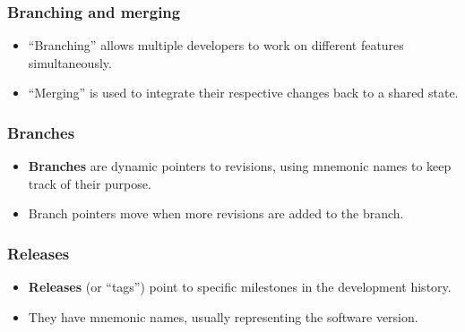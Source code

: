 \documentclass[aspectratio=169,xcolor=table]{beamer}
\begin{document}
    \begin{frame}
        \frametitle{Branching and merging}

        \begin{block}{}
            \begin{itemize}
                \item ``Branching'' allows multiple developers to work on
                    different features simultaneously.
                \item ``Merging'' is used to integrate their respective changes
                    back to a shared state.
            \end{itemize}
        \end{block}
        \vfill
        \begin{figure}
            \centering
            \scalebox{0.8}{}
        \end{figure}
    \end{frame}

    \begin{frame}
        \frametitle{Branches}
        \begin{block}{}
            \begin{itemize}
                \item \textbf{Branches} are dynamic pointers to revisions,
                    using mnemonic names to keep track of their purpose.
                \item Branch pointers move when more revisions are added to the
                    branch.
            \end{itemize}
        \end{block}
        \vfill
        \begin{figure}
            \centering
            \scalebox{0.8}{}
        \end{figure}
    \end{frame}

    \begin{frame}
        \frametitle{Releases}
        \begin{block}{}
            \begin{itemize}
                \item \textbf{Releases} (or ``tags'') point to specific
                    milestones in the development history.
                \item They have mnemonic names, usually representing the
                    software version.
            \end{itemize}
        \end{block}
        \vfill
        \begin{figure}
            \centering
            \scalebox{0.8}{}
        \end{figure}
    \end{frame}
\end{document}
